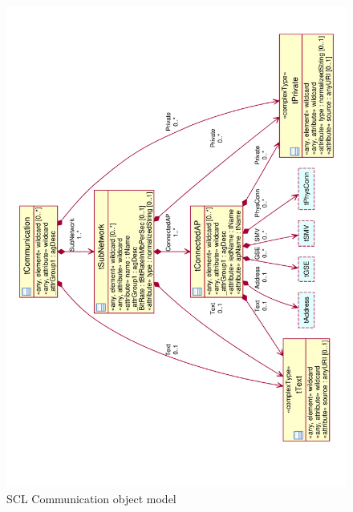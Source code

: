 \begin{landscape}
	\begin{figure}
	  \includegraphics[angle=-90, width=1.0\linewidth]
	  				{chapters/ch-scl/figures/SCL-uml-communication-Deept3}
	  \caption{SCL Communication object model}  
	  \label{fig:pdf-SCL-uml-communication-Deept3}
	\end{figure}
\end{landscape}


